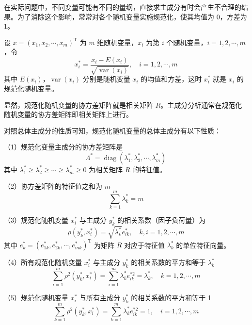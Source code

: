\documentclass[UTF8,12pt,a4paper,fontset=fandol]{ctexart}
\begin{document}
在实际问题中，不同变量可能有不同的量纲，直接求主成分有时会产生不合理的结果。为了消除这个影响，常常对各个随机变量实施规范化，使其均值为 0，方差为 1。

设 $x=(x_1,x_2,\cdots,x_m)^{\mathrm{T}}$ 为 $m$ 维随机变量，$x_i$ 为第 $i$ 个随机变量，$i=1,2,\cdots,m$，令
\begin{equation}
x_i^*=\frac{x_i-E(x_i)}{\sqrt{\operatorname{var}(x_i)}},\quad i=1,2,\cdots,m
\tag{16.33}
\end{equation}
其中 $E(x_i)$，$\operatorname{var}(x_i)$ 分别是随机变量 $x_i$ 的均值和方差，这时 $x_i^*$ 就是 $x_i$ 的规范化随机变量。

显然，规范化随机变量的协方差矩阵就是相关矩阵 $R$。主成分分析通常在规范化随机变量的协方差矩阵即相关矩阵上进行。

对照总体主成分的性质可知，规范化随机变量的总体主成分有以下性质：

（1）规范化变量主成分的协方差矩阵是
\begin{equation}
\Lambda^*=\operatorname{diag}(\lambda_1^*,\lambda_2^*,\cdots,\lambda_m^*)
\tag{16.34}
\end{equation}
其中 $\lambda_1^*\geqslant\lambda_2^*\geqslant\cdots\geqslant\lambda_m^*\geqslant 0$ 为相关矩阵 $R$ 的特征值。

（2）协方差矩阵的特征值之和为 $m$
\begin{equation}
\sum_{k=1}^m\lambda_k^*=m
\tag{16.35}
\end{equation}

（3）规范化随机变量 $x_i^*$ 与主成分 $y_k^*$ 的相关系数（因子负荷量）为
\begin{equation}
\rho(y_k^*,x_i^*)=\sqrt{\lambda_k^*}e_{ik}^*,\quad k,i=1,2,\cdots,m
\tag{16.36}
\end{equation}
其中 $e_k^*=(e_{1k}^*,e_{2k}^*,\cdots,e_{mk}^*)^{\mathrm{T}}$ 为矩阵 $R$ 对应于特征值 $\lambda_k^*$ 的单位特征向量。

（4）所有规范化随机变量 $x_i^*$ 与主成分 $y_k^*$ 的相关系数的平方和等于 $\lambda_k^*$
\begin{equation}
\sum_{i=1}^m\rho^2(y_k^*,x_i^*)=\sum_{i=1}^m\lambda_k^*e_{ik}^{*2}=\lambda_k^*,\quad k=1,2,\cdots,m
\tag{16.37}
\end{equation}

（5）规范化随机变量 $x_i^*$ 与所有主成分 $y_k^*$ 的相关系数的平方和等于 1
\begin{equation}
\sum_{k=1}^m\rho^2(y_k^*,x_i^*)=\sum_{k=1}^m\lambda_k^*e_{ik}^{*2}=1,\quad i=1,2,\cdots,m
\tag{16.38}
\end{equation}
\end{document}
